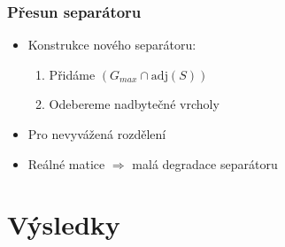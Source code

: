 \documentclass{beamer}
\begin{document}
\begin{frame}
  \frametitle{Přesun separátoru}
  \begin{itemize}
    \item Konstrukce nového separátoru:
      \medskip
      \begin{enumerate}
          \item Přidáme $(G_{max} \cap\mathrm{adj}(S))$
          \medskip
          \item Odebereme nadbytečné vrcholy
        \end{enumerate}
      \medskip
    \item Pro nevyvážená rozdělení
    \medskip
    \item Reálné matice $\Rightarrow$ malá degradace separátoru
  \end{itemize}
\end{frame} 

	\section{Výsledky}
\end{document}

